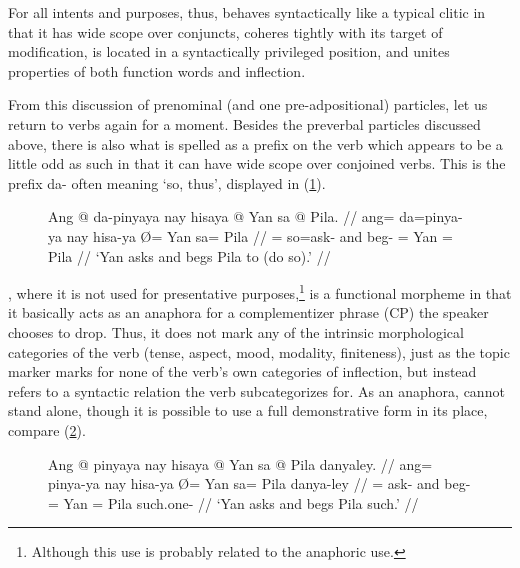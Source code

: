 For all intents and purposes, thus,  behaves syntactically like
a typical clitic in that it has wide scope over conjuncts, coheres tightly with
its target of modification, is located in a syntactically privileged position,
and unites properties of both function words and inflection.

\label{clitics_preverb_da}
From this discussion of prenominal (and one pre-adpositional) particles, let us
return to verbs again for a moment. Besides the preverbal particles discussed
above, there is also what is spelled as a prefix on the verb which appears to
be a little odd as such in that it can have wide scope over conjoined verbs.
This is the prefix  {da-} often meaning `so, thus', displayed in
(\ref{ex:clitics_13}).

\begin{figure}
\ex\label{ex:clitics_13}\begingl
	\gla Ang @ da-pinyaya nay hisaya {} @ Yan sa @ Pila. //
	\glb ang= da=pinya-ya nay hisa-ya Ø= Yan sa= Pila //
	\glc \AgtT{}= so=ask-\TsgM{} and beg-\TsgM{} \Top{}= Yan \Parg{}= Pila //
	\glft `Yan asks and begs Pila to (do so).' //
\endgl\xe
\end{figure}

, where it is not used for presentative 
purposes,\footnote{Although this use is probably related to the anaphoric use.}
is a functional morpheme in that it basically acts as an anaphora for a
complementizer phrase (CP) the speaker chooses to drop. Thus, it does not mark
any of the intrinsic morphological categories of the verb (tense, aspect, mood,
modality, finiteness), just as the topic marker marks for none of the verb's
own categories of inflection, but instead refers to a syntactic relation the
verb subcategorizes for. As an anaphora,  cannot stand alone,
though it is possible to use a full demonstrative form  in its place, compare (\ref{ex:clitics_14}).

\begin{figure}[h]
\ex\label{ex:clitics_14}\begingl
	\gla Ang @ pinyaya nay hisaya {} @ Yan sa @ Pila danyaley. //
	\glb ang= pinya-ya nay hisa-ya Ø= Yan sa= Pila danya-ley //
	\glc \AgtT{}= ask-\TsgM{} and beg-\TsgM{} \Top{}= Yan \Parg{}= Pila
		such.one-\PargI{} //
	\glft `Yan asks and begs Pila such.' //
\endgl\xe
\end{figure}

